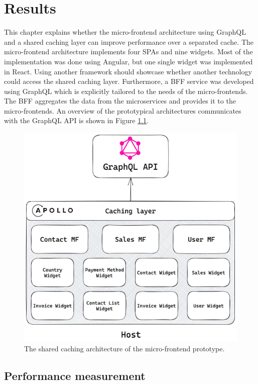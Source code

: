 \chapter{Results}\label{chapter:results}

This chapter explains whether the micro-frontend architecture using GraphQL and a shared caching layer can improve performance over a separated cache. The micro-frontend architecture implements four \acp{SPA} and nine widgets. Most of the implementation was done using Angular, but one single widget was implemented in React. Using another framework should showcase whether another technology could access the shared caching layer. Furthermore, a \ac{BFF} service was developed using GraphQL which is explicitly tailored to the needs of the micro-frontends. The \ac{BFF} aggregates the data from the microservices and provides it to the micro-frontends. An overview of the prototypical architectures communicates with the GraphQL \ac{API} is shown in Figure \ref{fig:results:micro-frontend-prototype}.

\ifshowImages
\begin{figure}[H]
  \centering
  \includegraphics[width=0.7\linewidth]{images/results/micro-frontend-prototype.png}
  \caption{The shared caching architecture of the micro-frontend prototype.}\label{fig:results:micro-frontend-prototype}
\end{figure}
\fi

\section{Performance measurement}\label{section:results:performance-measurement}

